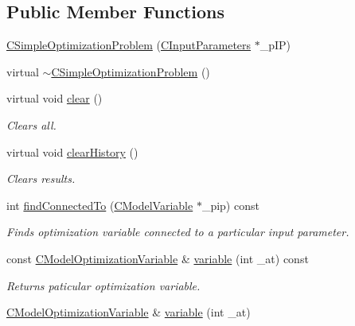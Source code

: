 \subsection*{Public Member Functions}
\begin{DoxyCompactItemize}
\item 
\hyperlink{class_go_s_u_m_1_1_c_simple_optimization_problem_aca2f3702b5973f9eff6eee3ba2fba9f7}{C\-Simple\-Optimization\-Problem} (\hyperlink{class_go_s_u_m_1_1_c_input_parameters}{C\-Input\-Parameters} $\ast$\-\_\-p\-I\-P)
\item 
virtual \hyperlink{class_go_s_u_m_1_1_c_simple_optimization_problem_a3e604a851cc89ce49daf95d0ca9d1cbb}{$\sim$\-C\-Simple\-Optimization\-Problem} ()
\item 
virtual void \hyperlink{class_go_s_u_m_1_1_c_simple_optimization_problem_ac5843023c605a273e8276656336b51af}{clear} ()
\begin{DoxyCompactList}\small\item\em Clears all. \end{DoxyCompactList}\item 
virtual void \hyperlink{class_go_s_u_m_1_1_c_simple_optimization_problem_a87a5cfb79c799788b85705794c373f40}{clear\-History} ()
\begin{DoxyCompactList}\small\item\em Clears results. \end{DoxyCompactList}\item 
int \hyperlink{class_go_s_u_m_1_1_c_simple_optimization_problem_a022d38045804084463299d89bffb7d42}{find\-Connected\-To} (\hyperlink{class_go_s_u_m_1_1_c_model_variable}{C\-Model\-Variable} $\ast$\-\_\-pip) const 
\begin{DoxyCompactList}\small\item\em Finds optimization variable connected to a particular input parameter. \end{DoxyCompactList}\item 
const \hyperlink{class_go_s_u_m_1_1_c_model_optimization_variable}{C\-Model\-Optimization\-Variable} \& \hyperlink{class_go_s_u_m_1_1_c_simple_optimization_problem_a8f390c55136c8324ba5fce698482aaa2}{variable} (int \-\_\-at) const 
\begin{DoxyCompactList}\small\item\em Returns paticular optimization variable. \end{DoxyCompactList}\item 
\hyperlink{class_go_s_u_m_1_1_c_model_optimization_variable}{C\-Model\-Optimization\-Variable} \& \hyperlink{class_go_s_u_m_1_1_c_simple_optimization_problem_a48d8644397b8ca9c8408263465035458}{variable} (int \-\_\-at)

\end{DoxyCompactItemize}
